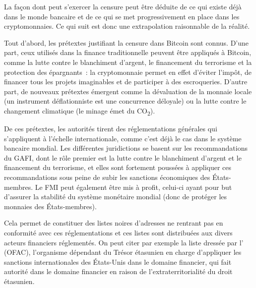 La façon dont peut s'exercer la censure peut être déduite de ce qui existe déjà dans le monde bancaire et de ce qui se met progressivement en place dans les cryptomonnaies. Ce qui suit est donc une extrapolation raisonnable de la réalité.

Tout d'abord, les prétextes justifiant la censure dans Bitcoin sont connus. D'une part, ceux utilisés dans la finance traditionnelle peuvent être appliqués à Bitcoin, comme la lutte contre le blanchiment d'argent, le financement du terrorisme et la protection des épargnants~: la cryptomonnaie permet en effet d'éviter l'impôt, de financer tous les projets imaginables et de participer à des escroqueries. D'autre part, de nouveaux prétextes émergent comme la dévaluation de la monnaie locale (un instrument déflationniste est une concurrence déloyale) ou la lutte contre le changement climatique (le minage émet du CO\textsubscript{2}).

De ces prétextes, les autorités tirent des réglementations générales qui s'appliquent à l'échelle internationale, comme c'est déjà le cas dans le système bancaire mondial. Les différentes juridictions se basent sur les recommandations du GAFI, dont le rôle premier est la lutte contre le blanchiment d'argent et le financement du terrorisme, et elles sont fortement poussées à appliquer ces recommandations sous peine de subir les sanctions économiques des États-membres. Le FMI peut également être mis à profit, celui-ci ayant pour but d'assurer la stabilité du système monétaire mondial (donc de protéger les monnaies des États-membres).

Cela permet de constituer des listes noires d'adresses ne rentrant pas en conformité avec ces réglementations et ces listes sont distribuées aux divers acteurs financiers réglementés. On peut citer par exemple la liste dressée par l' (OFAC), l'organisme dépendant du Trésor étasunien en charge d'appliquer les sanctions internationales des États-Unis dans le domaine financier, qui fait autorité dans le domaine financier en raison de l'extraterritorialité du droit étasunien.

